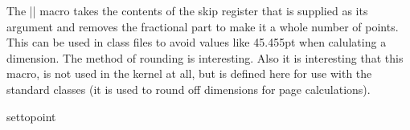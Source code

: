 \DescribeMacro{\@settopoint}
The |\@settopoint| macro takes the contents of the skip register that is supplied as its argument
and removes the fractional part to make it a whole number of points. This can be
used in class files to avoid values like 45.455pt when calulating a dimension. The method of
rounding is interesting. Also it is interesting that this macro, is not used in the kernel at all, but is defined
here for use with the standard classes (it is used to round off dimensions for page calculations).

\medskip
\begin{texexample}{settopoint}{}
  \makeatletter
  \def\@settopoint#1{\divide#1\p@\multiply#1\p@}
  \newlength\@test
  \setlength\@test{19.5pt}
  \@settopoint{\@test}
  \the\@test
  \makeatother
\end{texexample}




